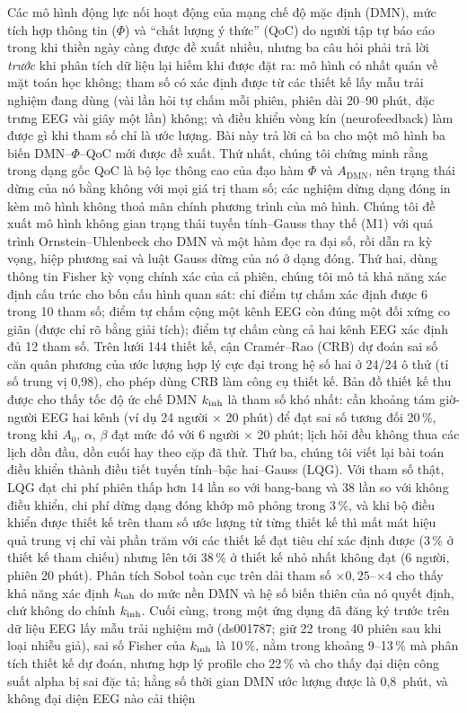 \vspace{0.3cm}
\begin{tcolorbox}[mathbox,title=Tóm tắt]
\small
Các mô hình động lực nối hoạt động của mạng chế độ mặc định (DMN), mức tích hợp thông tin ($\Phi$) và ``chất lượng ý thức'' (QoC) do người tập tự báo cáo trong khi thiền ngày càng được đề xuất nhiều, nhưng ba câu hỏi phải trả lời \emph{trước} khi phân tích dữ liệu lại hiếm khi được đặt ra: mô hình có nhất quán về mặt toán học không; tham số có xác định được từ các thiết kế lấy mẫu trải nghiệm đang dùng (vài lần hỏi tự chấm mỗi phiên, phiên dài 20--90 phút, đặc trưng EEG vài giây một lần) không; và điều khiển vòng kín (neurofeedback) làm được gì khi tham số chỉ là ước lượng. Bài này trả lời cả ba cho một mô hình ba biến DMN--$\Phi$--QoC mới được đề xuất. Thứ nhất, chúng tôi chứng minh rằng trong dạng gốc QoC là bộ lọc thông cao của đạo hàm $\Phi$ và $A_{\mathrm{DMN}}$, nên trạng thái dừng của nó bằng không với mọi giá trị tham số; các nghiệm dừng dạng đóng in kèm mô hình không thoả mãn chính phương trình của mô hình. Chúng tôi đề xuất mô hình không gian trạng thái tuyến tính--Gauss thay thế (M1) với quá trình Ornstein--Uhlenbeck cho DMN và một hàm đọc ra đại số, rồi dẫn ra kỳ vọng, hiệp phương sai và luật Gauss dừng của nó ở dạng đóng. Thứ hai, dùng thông tin Fisher kỳ vọng chính xác của cả phiên, chúng tôi mô tả khả năng xác định cấu trúc cho bốn cấu hình quan sát: chỉ điểm tự chấm xác định được 6 trong 10 tham số; điểm tự chấm cộng một kênh EEG còn đúng một đối xứng co giãn (được chỉ rõ bằng giải tích); điểm tự chấm cùng cả hai kênh EEG xác định đủ 12 tham số. Trên lưới 144 thiết kế, cận Cramér--Rao (CRB) dự đoán sai số căn quân phương của ước lượng hợp lý cực đại trong hệ số hai ở 24/24 ô thử (tỉ số trung vị 0,98), cho phép dùng CRB làm công cụ thiết kế. Bản đồ thiết kế thu được cho thấy tốc độ ức chế DMN $k_{\mathrm{inh}}$ là tham số khó nhất: cần khoảng tám giờ-người EEG hai kênh (ví dụ 24 người $\times$ 20 phút) để đạt sai số tương đối 20\,\%, trong khi $A_0$, $\alpha$, $\beta$ đạt mức đó với 6 người $\times$ 20 phút; lịch hỏi đều không thua các lịch dồn đầu, dồn cuối hay theo cặp đã thử. Thứ ba, chúng tôi viết lại bài toán điều khiển thành điều tiết tuyến tính--bậc hai--Gauss (LQG). Với tham số thật, LQG đạt chi phí phiên thấp hơn 14 lần so với bang-bang và 38 lần so với không điều khiển, chi phí dừng dạng đóng khớp mô phỏng trong 3\,\%, và khi bộ điều khiển được thiết kế trên tham số ước lượng từ từng thiết kế thì mất mát hiệu quả trung vị chỉ vài phần trăm với các thiết kế đạt tiêu chí xác định được (3\,\% ở thiết kế tham chiếu) nhưng lên tới 38\,\% ở thiết kế nhỏ nhất không đạt (6 người, phiên 20 phút). Phân tích Sobol toàn cục trên dải tham số $\times 0{,}25$--$\times 4$ cho thấy khả năng xác định $k_{\mathrm{inh}}$ do mức nền DMN và hệ số biến thiên của nó quyết định, chứ không do chính $k_{\mathrm{inh}}$. Cuối cùng, trong một ứng dụng đã đăng ký trước trên dữ liệu EEG lấy mẫu trải nghiệm mở (ds001787; giữ 22 trong 40 phiên sau khi loại nhiễu giả), sai số Fisher của $k_{\mathrm{inh}}$ là 10\,\%, nằm trong khoảng 9--13\,\% mà phân tích thiết kế dự đoán, nhưng hợp lý profile cho 22\,\% và cho thấy đại diện công suất alpha bị sai đặc tả; hằng số thời gian DMN ước lượng được là 0,8~phút, và không đại diện EEG nào cải thiện 
\end{tcolorbox}
